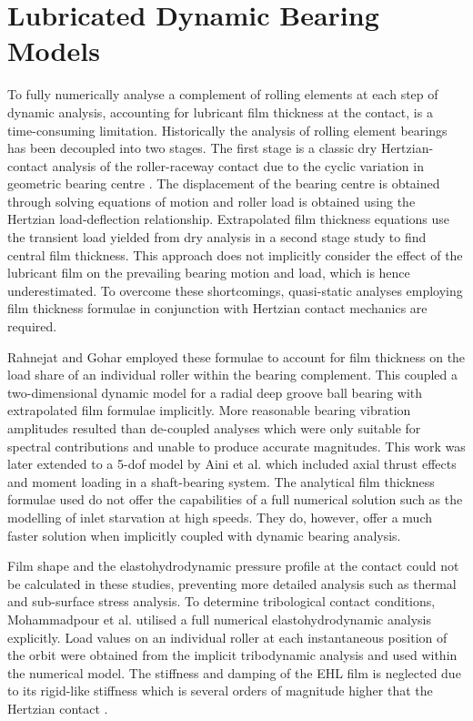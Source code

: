 \section{Lubricated Dynamic Bearing Models}

To fully numerically analyse a complement of rolling elements at each step of dynamic analysis, accounting for lubricant film thickness at the contact, is a time-consuming limitation. Historically the analysis of rolling element bearings has been decoupled into two stages. The first stage is a classic dry Hertzian-contact analysis of the roller-raceway contact due to the cyclic variation in geometric bearing centre \cite{Aini1990}. The displacement of the bearing centre is obtained through solving equations of motion and roller load is obtained using the Hertzian load-deflection relationship. Extrapolated film thickness equations use the transient load yielded from dry analysis in a second stage study to find central film thickness. This approach does not implicitly consider the effect of the lubricant film on the prevailing bearing motion and load, which is hence underestimated. To overcome these shortcomings, quasi-static analyses employing film thickness formulae in conjunction with Hertzian contact mechanics are required.

Rahnejat and Gohar \cite{Rahnejat1985} employed these formulae to account for film thickness on the load share of an individual roller within the bearing complement. This coupled a two-dimensional dynamic model for a radial deep groove ball bearing with extrapolated film formulae implicitly. More reasonable bearing vibration amplitudes resulted than de-coupled analyses which were only suitable for spectral contributions and unable to produce accurate magnitudes. This work was later extended to a 5-dof model by Aini et al. \cite{Aini2002} which included axial thrust effects and moment loading in a shaft-bearing system. The analytical film thickness formulae used do not offer the capabilities of a full numerical solution such as the modelling of inlet starvation at high speeds. They do, however, offer a much faster solution when implicitly coupled with dynamic bearing analysis.

Film shape and the elastohydrodynamic pressure profile at the contact could not be calculated in these studies, preventing more detailed analysis such as thermal and sub-surface stress analysis. To determine tribological contact conditions, Mohammadpour et al. \cite{Mohammadpour2015c} utilised a full numerical elastohydrodynamic analysis explicitly. Load values on an individual roller at each instantaneous position of the orbit were obtained from the implicit tribodynamic analysis and used within the numerical model. The stiffness and damping of the EHL film is neglected due to its rigid-like stiffness which is several orders of magnitude higher that the Hertzian contact \cite{Dareing1975} \cite{Mehdigoli1990}. 

